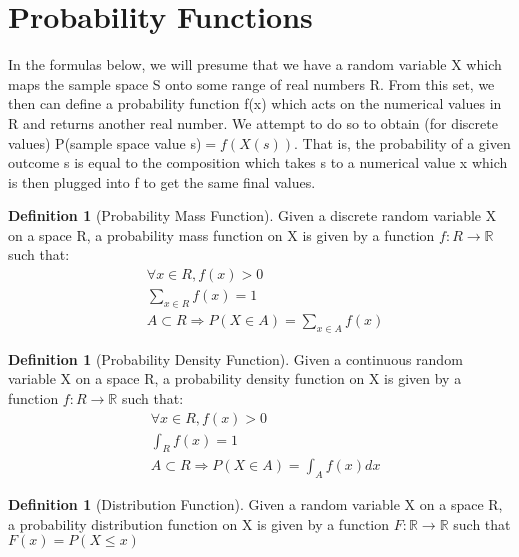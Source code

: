 \documentclass[10pt,]{book}
\theoremstyle{plain}
\theoremstyle{definition}
\newtheorem{definition}[theorem]{Definition}
\theoremstyle{definition}
\numberwithin{equation}{section}
\newcommand{\gt}{ > }
\begin{document}
\section[Probability Functions]{Probability Functions}\label{ProbabilityFunctions}
In the formulas below, we will presume that we have a random variable X which maps the sample space S onto some range of real numbers R.  From
this set, we then can define a probability function f(x) which acts on the numerical values in R and returns another real number.  We attempt to do so 
to obtain (for discrete values) P(sample space value s)\( = f(X(s))\).  That is, the probability of a given outcome s is equal to the composition 
which takes s to a numerical value x which is then plugged into f to get the same final values.%
\begin{definition}[Probability Mass Function]\label{definition-3}
Given a discrete random variable X on a space R, a probability mass function on X is given by a function \(f:R \rightarrow \mathbb{R}\) such that:
		\begin{align*}
& \forall x \in R , f(x) \gt 0\\
& \sum_{x \in R} f(x) = 1\\
& A \subset R \Rightarrow P(X \in A) = \sum_{x \in A}f(x)
\end{align*}\end{definition}
\begin{definition}[Probability Density Function]\label{definition-4}
Given a continuous random variable X on a space R, a probability density function on X is given by a function \(f:R \rightarrow \mathbb{R}\) such that:
			\begin{align*}
& \forall x \in R , f(x) \gt 0\\
& \int_{R} f(x) = 1\\
& A \subset R \Rightarrow P(X \in A) = \int_{A} f(x) dx
\end{align*}\end{definition}
\begin{definition}[Distribution Function]\label{definition-5}
Given a random variable X on a space R, a probability distribution function on X is given by a function 
				   \(F:\mathbb{R} \rightarrow \mathbb{R}\) such that \(\displaystyle F(x)=P(X \le x)\)\end{definition}
\typeout{************************************************}
\typeout{************************************************}
\end{document}
